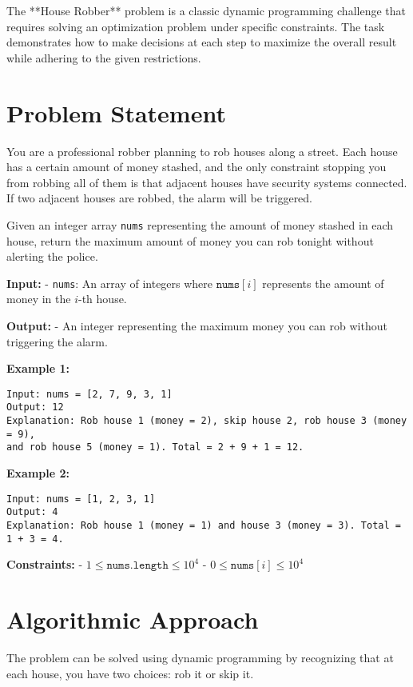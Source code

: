 
\label{problem:House_Robber}

The **House Robber** problem is a classic dynamic programming challenge that requires solving an optimization problem under specific constraints. The task demonstrates how to make decisions at each step to maximize the overall result while adhering to the given restrictions.

\section*{Problem Statement}
You are a professional robber planning to rob houses along a street. Each house has a certain amount of money stashed, and the only constraint stopping you from robbing all of them is that adjacent houses have security systems connected. If two adjacent houses are robbed, the alarm will be triggered.

Given an integer array \texttt{nums} representing the amount of money stashed in each house, return the maximum amount of money you can rob tonight without alerting the police.

\textbf{Input:}
- \texttt{nums}: An array of integers where \( \texttt{nums}[i] \) represents the amount of money in the \( i \)-th house.

\textbf{Output:}
- An integer representing the maximum money you can rob without triggering the alarm.

\textbf{Example 1:}
\begin{verbatim}
Input: nums = [2, 7, 9, 3, 1]
Output: 12
Explanation: Rob house 1 (money = 2), skip house 2, rob house 3 (money = 9), 
and rob house 5 (money = 1). Total = 2 + 9 + 1 = 12.
\end{verbatim}

\textbf{Example 2:}
\begin{verbatim}
Input: nums = [1, 2, 3, 1]
Output: 4
Explanation: Rob house 1 (money = 1) and house 3 (money = 3). Total = 1 + 3 = 4.
\end{verbatim}

\textbf{Constraints:}
- \( 1 \leq \texttt{nums.length} \leq 10^4 \)
- \( 0 \leq \texttt{nums}[i] \leq 10^4 \)

\section*{Algorithmic Approach}
The problem can be solved using dynamic programming by recognizing that at each house, you have two choices: rob it or skip it. 


